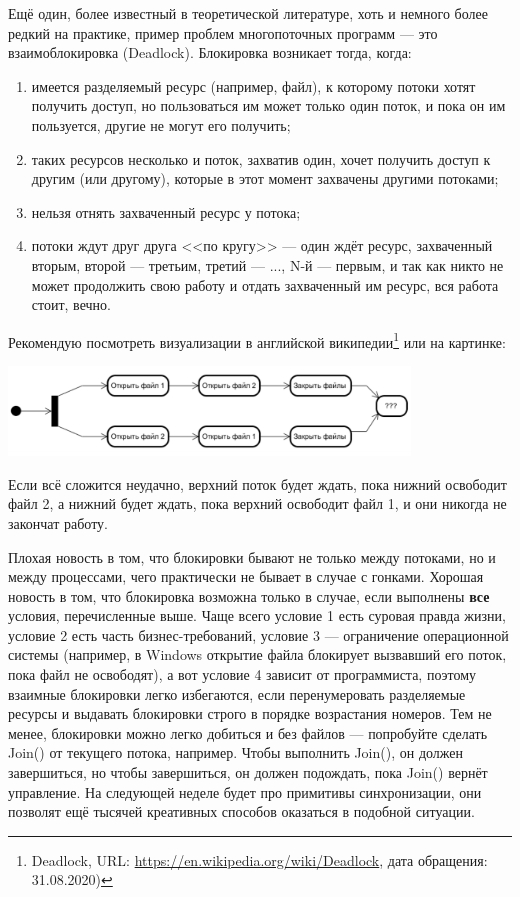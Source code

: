 \documentclass[a5paper]{article}
\begin{document}
Ещё один, более известный в теоретической литературе, хоть и немного более редкий на практике, пример проблем многопоточных программ --- это взаимоблокировка (Deadlock). Блокировка возникает тогда, когда:
\begin{enumerate}
    \item имеется разделяемый ресурс (например, файл), к которому потоки хотят получить доступ, но пользоваться им может только один поток, и пока он им пользуется, другие не могут его получить;
    \item таких ресурсов несколько и поток, захватив один, хочет получить доступ к другим (или другому), которые в этот момент захвачены другими потоками;
    \item нельзя отнять захваченный ресурс у потока;
    \item потоки ждут друг друга <<по кругу>> --- один ждёт ресурс, захваченный вторым, второй --- третьим, третий --- ..., N-й --- первым, и так как никто не может продолжить свою работу и отдать захваченный им ресурс, вся работа стоит, вечно.
\end{enumerate}

Рекомендую посмотреть визуализации в английской википедии\footnote{Deadlock, URL: \url{https://en.wikipedia.org/wiki/Deadlock}, дата обращения: 31.08.2020)} или на картинке: 

\begin{center}
    \includegraphics[width=0.8\textwidth]{deadlock.png}
\end{center}

Если всё сложится неудачно, верхний поток будет ждать, пока нижний освободит файл 2, а нижний будет ждать, пока верхний освободит файл 1, и они никогда не закончат работу.

Плохая новость в том, что блокировки бывают не только между потоками, но и между процессами, чего практически не бывает в случае с гонками. Хорошая новость в том, что блокировка возможна только в случае, если выполнены \textbf{все} условия, перечисленные выше. Чаще всего условие 1 есть суровая правда жизни, условие 2 есть часть бизнес-требований, условие 3 --- ограничение операционной системы (например, в Windows открытие файла блокирует вызвавший его поток, пока файл не освободят), а вот условие 4 зависит от программиста, поэтому взаимные блокировки легко избегаются, если перенумеровать разделяемые ресурсы и выдавать блокировки строго в порядке возрастания номеров. Тем не менее, блокировки можно легко добиться и без файлов --- попробуйте сделать Join() от текущего потока, например. Чтобы выполнить Join(), он должен завершиться, но чтобы завершиться, он должен подождать, пока Join() вернёт управление. На следующей неделе будет про примитивы синхронизации, они позволят ещё тысячей креативных способов оказаться в подобной ситуации.
\end{document}
